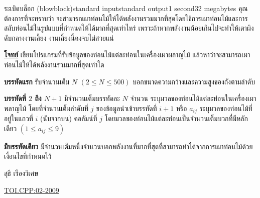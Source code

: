 \documentclass[11pt,a4paper]{article}
\begin{document}
\begin{problem}{ระเบิดบล็อก (blowblock)}{standard input}{standard output}{1 second}{32 megabytes}
 คุณต้องการที่จะทราบว่า จะสามารถเผาท่อนไม้ให้ได้พลังงานรวมมากที่สุดโดยใช้การเผาท่อนไม้และการสลับท่อนไม้ในรูปแบบที่กำหนดให้ได้มากที่สุดเท่าไหร่ เพราะถ้าหากพลังงานน้อยเกินไปจะทำให้เตาผิงดับกลางงานเลี้ยง งานเลี้ยงนี้คงจบไม่สวยแน่

\newpage
\bigskip
\underline{\textbf{โจทย์}}   เขียนโปรแกรมที่รับข้อมูลของท่อนไม้แต่ละท่อนในเครื่องเผาผลาญไม้ แล้วหาว่าจะสามารถเผาท่อนไม้ให้ได้พลังงานรวมมากที่สุดเท่าใด

\InputFile

\textbf{บรรทัดแรก} รับจำนวนเต็ม $N$ $(2 \leq N \leq 500)$ บอกขนาดความกว้างและความสูงของถังตามลำดับ

\textbf{บรรทัดที่ $2$ ถึง $N+1$} มีจำนวนเต็มบรรทัดละ $N$ จำนวน ระบุมวลของท่อนไม้แต่ละท่อนในเครื่องเผาพลาญไม้ โดยที่จำนวนเต็มลำดับที่ $j$ ของข้อมูลนำเข้าบรรทัดที่ $i+1$ หรือ $a_{ij}$ ระบุมวลของท่อนไม้ที่อยู่ในแถวที่ $i$ (นับจากบน) คอลัมน์ที่ $j$ โดยมวลของท่อนไม้แต่ละท่อนเป็นจำนวนเต็มบวกที่มีหลักเดียว $(1 \leq a_{ij} \leq 9)$


\OutputFile

\textbf{มีบรรทัดเดียว} มีจำนวนเต็มหนึ่งจำนวนบอกพลังงานที่มากที่สุดที่สามารถทำได้จากการเผาท่อนไม้ด้วยเงื่อนไขที่กำหนดไว้

\Examples

\begin{example}
%
\end{example}


\Source

สุธี เรืองวิเศษ

\underline{\href{http://www.thailandoi.org/toi.c/02-2009}{TOI.CPP:02-2009}}

\end{problem}
\end{document}
